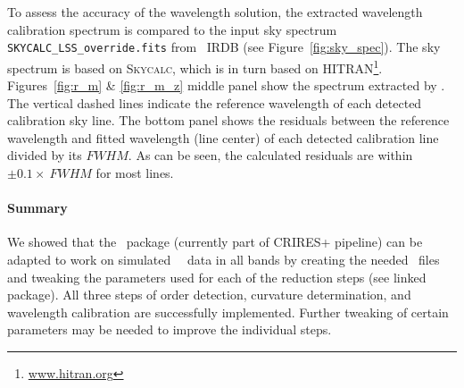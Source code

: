 To assess the accuracy of the wavelength solution, the extracted wavelength calibration spectrum is compared to the input sky spectrum \texttt{SKYCALC\_LSS\_override.fits} from \met~IRDB (see Figure~\ref{fig:sky_spec}). The sky spectrum is based on \textsc{Skycalc}, which is in turn based on \textsc{HITRAN}\footnote{\url{www.hitran.org}}. Figures~\ref{fig:r_m} \& \ref{fig:r_m_z} middle panel show the spectrum extracted by \pyred. The vertical dashed lines indicate the reference wavelength of each detected calibration sky line. The bottom panel shows the residuals between the reference wavelength and fitted wavelength (line center) of each detected calibration line divided by its $FWHM$. As can be seen, the calculated residuals are within $\pm 0.1 \times~FWHM$ for most lines.






\paragraph{Summary}
We showed  that the \pyred~package (currently part of CRIRES+ pipeline) can be adapted to work on simulated \met~\lss~data in all bands by creating the needed \pyred~files and tweaking the parameters used for each of the reduction steps (see linked package). All three steps of order detection, curvature determination, and wavelength calibration are successfully implemented. Further tweaking of certain parameters may be needed to improve the individual steps.




